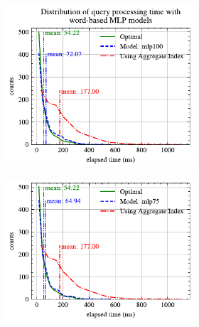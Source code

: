\begin{figure}[!th]
	\centering
	\begin{subfigure}{0.45\textwidth}
		\begin{subfigure}{\textwidth}
			\centering
%			
			\includegraphics[]{my/graphics/perf_dist_mlp100_B.pdf}
		\end{subfigure}
		\vfill
		\begin{subfigure}{\textwidth}
			\centering
			\includegraphics[]{my/graphics/perf_dist_mlp75_B.pdf}
		\end{subfigure}
		\vfill
		\begin{subfigure}{\textwidth}
			\centering

\end{subfigure}
\end{subfigure}
\end{figure}
